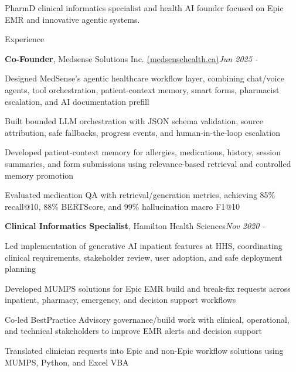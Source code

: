 \documentclass{resume}
\begin{document}
\small
\vspace{0.9em}
\begin{center}
\begin{minipage}{\textwidth}
\centering
PharmD clinical informatics specialist and health AI founder focused on Epic EMR and innovative agentic systems.
\end{minipage}
\end{center}
\vspace{1.0em}

\begin{rSection}{Experience}

{\bf Co-Founder}{, }{Medsense Solutions Inc. \href{https://medsensehealth.ca}{(medsensehealth.ca)}}\hfill {\em Jun 2025 - }
\item[$\bullet$] Designed MedSense's agentic healthcare workflow layer, combining chat/voice agents, tool orchestration, patient-context memory, smart forms, pharmacist escalation, and AI documentation prefill
\item[$\bullet$] Built bounded LLM orchestration with JSON schema validation, source attribution, safe fallbacks, progress events, and human-in-the-loop escalation
\item[$\bullet$] Developed patient-context memory for allergies, medications, history, session summaries, and form submissions using relevance-based retrieval and controlled memory promotion
\item[$\bullet$] Evaluated medication QA with retrieval/generation metrics, achieving 85\% recall@10, 88\% BERTScore, and 99\% hallucination macro F1@10
\vspace{0.2em}

{\bf Clinical Informatics Specialist}{, }{Hamilton Health Sciences}\hfill {\em Nov 2020 - }
\item[$\bullet$] Led implementation of generative AI inpatient features at HHS, coordinating clinical requirements, stakeholder review, user adoption, and safe deployment planning
\item[$\bullet$] Developed MUMPS solutions for Epic EMR build and break-fix requests across inpatient, pharmacy, emergency, and decision support workflows
\item[$\bullet$] Co-led BestPractice Advisory governance/build work with clinical, operational, and technical stakeholders to improve EMR alerts and decision support
\item[$\bullet$] Translated clinician requests into Epic and non-Epic workflow solutions using MUMPS, Python, and Excel VBA
\vspace{0.2em}


\end{rSection}
\end{document}
